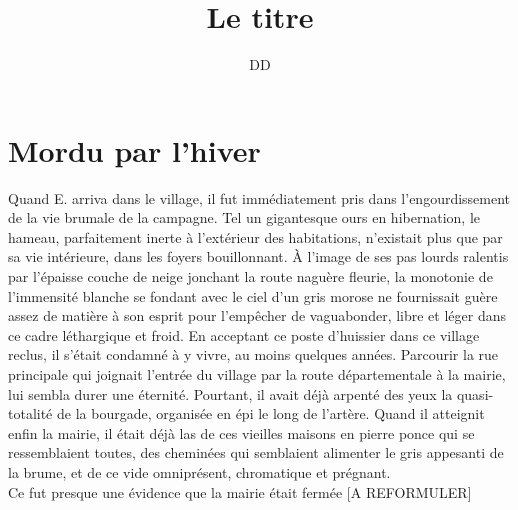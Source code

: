 \documentclass[french,amstex,12pt,a5paper]{book}
\begin{document}
\title{Le titre}
\author{DD}
\maketitle

\tableofcontents

\chapter{Mordu par l'hiver}

Quand E. arriva dans le village, il fut immédiatement pris dans l'engourdissement de la vie brumale de la campagne. Tel un gigantesque ours en hibernation, le hameau, parfaitement inerte à l'extérieur des habitations, n'existait plus que par sa vie intérieure, dans les foyers bouillonnant. À l'image de ses pas lourds ralentis par l'épaisse couche de neige jonchant la route naguère fleurie, la monotonie de l'immensité blanche se fondant avec le ciel d'un gris morose ne fournissait guère assez de matière à son esprit pour l'empêcher de vaguabonder, libre et léger dans ce cadre léthargique et froid. En acceptant ce poste d'huissier dans ce village reclus, il s'était condamné à y vivre, au moins quelques années. Parcourir la rue principale qui joignait l'entrée du village par la route départementale à la mairie, lui sembla durer une éternité. Pourtant, il avait déjà arpenté des yeux la quasi-totalité de la bourgade, organisée en épi le long de l'artère. Quand il atteignit enfin la mairie, il était déjà las de ces vieilles maisons en pierre ponce qui se ressemblaient toutes, des cheminées qui semblaient alimenter le gris appesanti de la brume, et de ce vide omniprésent, chromatique et prégnant.\\

Ce fut presque une évidence que la mairie était fermée [A REFORMULER]
\end{document}
